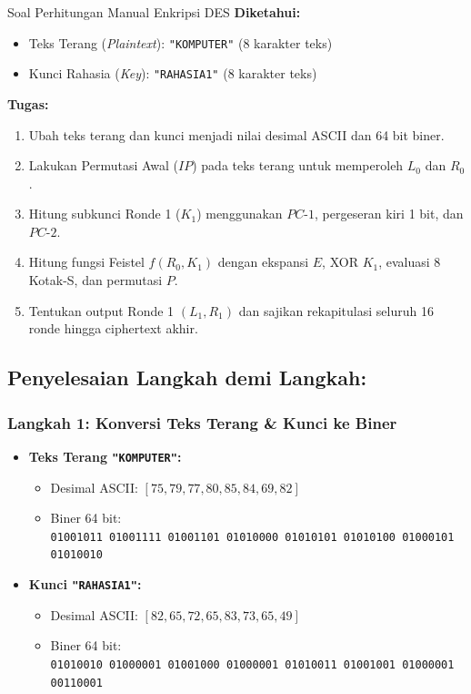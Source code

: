 \documentclass[11pt,a4paper]{article}
\begin{document}
\begin{problembox}{Soal Perhitungan Manual Enkripsi DES}
\textbf{Diketahui:}
\begin{itemize}[leftmargin=*]
    \item Teks Terang (\textit{Plaintext}): \texttt{"KOMPUTER"} (8 karakter teks)
    \item Kunci Rahasia (\textit{Key}): \texttt{"RAHASIA1"} (8 karakter teks)
\end{itemize}
\textbf{Tugas:}
\begin{enumerate}[leftmargin=*]
    \item Ubah teks terang dan kunci menjadi nilai desimal ASCII dan 64 bit biner.
    \item Lakukan Permutasi Awal ($IP$) pada teks terang untuk memperoleh $L_0$ dan $R_0$.
    \item Hitung subkunci Ronde 1 ($K_1$) menggunakan $PC\text{-}1$, pergeseran kiri 1 bit, dan $PC\text{-}2$.
    \item Hitung fungsi Feistel $f(R_0, K_1)$ dengan ekspansi $E$, XOR $K_1$, evaluasi 8 Kotak-S, dan permutasi $P$.
    \item Tentukan output Ronde 1 $(L_1, R_1)$ dan sajikan rekapitulasi seluruh 16 ronde hingga ciphertext akhir.
\end{enumerate}
\end{problembox}

\subsection*{Penyelesaian Langkah demi Langkah:}

\subsubsection*{Langkah 1: Konversi Teks Terang \& Kunci ke Biner}
\begin{itemize}[leftmargin=*]
    \item \textbf{Teks Terang \texttt{"KOMPUTER"}:}
    \begin{itemize}
        \item Desimal ASCII: $[75, 79, 77, 80, 85, 84, 69, 82]$
        \item Biner 64 bit:\\
        \texttt{01001011 01001111 01001101 01010000 01010101 01010100 01000101 01010010}
    \end{itemize}
    \item \textbf{Kunci \texttt{"RAHASIA1"}:}
    \begin{itemize}
        \item Desimal ASCII: $[82, 65, 72, 65, 83, 73, 65, 49]$
        \item Biner 64 bit:\\
        \texttt{01010010 01000001 01001000 01000001 01010011 01001001 01000001 00110001}
    \end{itemize}
\end{itemize}
\end{document}
